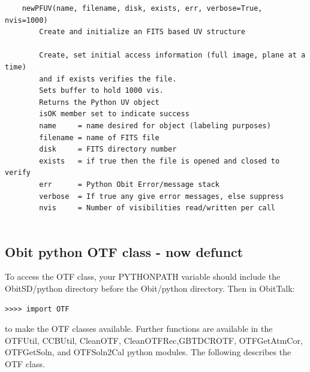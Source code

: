 \documentclass[11pt]{report}
\begin{document}
\begin{verbatim}
    newPFUV(name, filename, disk, exists, err, verbose=True, nvis=1000)
        Create and initialize an FITS based UV structure
        
        Create, set initial access information (full image, plane at a time)
        and if exists verifies the file.
        Sets buffer to hold 1000 vis.
        Returns the Python UV object
        isOK member set to indicate success
        name     = name desired for object (labeling purposes)
        filename = name of FITS file
        disk     = FITS directory number
        exists   = if true then the file is opened and closed to verify
        err      = Python Obit Error/message stack
        verbose  = If true any give error messages, else suppress
        nvis     = Number of visibilities read/written per call
 
\end{verbatim}

\subsection{Obit python OTF class - now defunct}
To access the OTF class, your PYTHONPATH variable should include the
ObitSD/python directory before the Obit/python directory.
Then in ObitTalk:
\begin{verbatim}
>>>> import OTF
\end{verbatim}
to make the OTF classes available.
Further functions are available in the OTFUtil, CCBUtil, CleanOTF,
CleanOTFRec,GBTDCROTF, OTFGetAtmCor, OTFGetSoln, and OTFSoln2Cal
python modules.
The following describes the OTF class.
\end{document}
